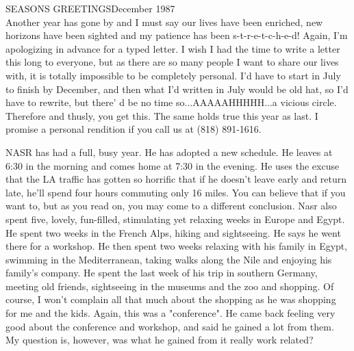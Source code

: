 
%

SEASONS GREETINGS\hfill December 1987\\


Another year has gone by and I must say our lives have been enriched, new horizons have been sighted and my patience has been s-t-r-e-t-c-h-e-d!
Again, I'm apologizing in advance for a typed letter. I wish I had the time to write a letter this long to everyone, but as there are so many
people I want to share our lives with, it is totally impossible to be completely personal. I'd have to start in July to finish by December, and
then what I'd written in July would be old hat, so I'd have to rewrite, but there' d be no time so...AAAAAHHHHH...a vicious circle. Therefore
and thusly, you get this. The same holds true this year as last. I promise a personal rendition if you call us at (818) 891-1616.


NASR has had a full, busy year. He has adopted a new schedule. He leaves at 6:30 in the morning and comes home at 7:30 in the evening. He uses
the excuse that the LA traffic has gotten so horrific that if he doesn't leave early and return late, he'll spend four hours commuting only 16
miles. You can believe that if you want to, but as you read on, you may come to a different conclusion. Nasr also spent five, lovely,
fun-filled, stimulating yet relaxing weeks in Europe and Egypt. He spent two weeks in the French Alps, hiking and sightseeing. He says he went
there for a workshop. He then spent two weeks relaxing with his family in Egypt, swimming in the Mediterranean, taking walks along the Nile and
enjoying his family's company. He spent the last week of his trip in southern Germany, meeting old friends, sightseeing in the museums and the
zoo and shopping. Of course, I won't complain all that much about the shopping as he was shopping for me and the kids. Again, this was a
"conference". He came back feeling very good about the conference and workshop, and said he gained a lot from them. My question is, however, was
what he gained from it really work related?



